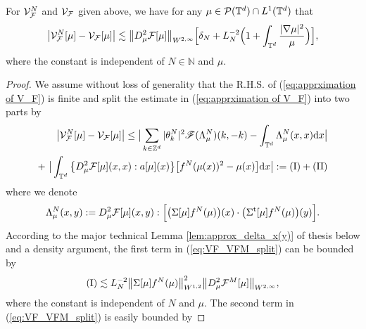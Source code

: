 \begin{lem}\label{lem:approximation_quadratic_variation} For $\mathcal{V}_{\mathcal{F}}^N$ and $\mathcal{V}_{\mathcal{F}}$ given above, we have for any $\mu \in \mathcal{P}(\mathbb{T}^d) \cap L^1(\mathbb{T}^d) $ that
\begin{equation}\label{eq:apprximation of V_F}
\begin{split}
\big|\mathcal{V}_{\mathcal{F}}^N[\mu] - \mathcal{V}_{\mathcal{F}}[\mu] \big| \lesssim\big\|D^2_{\mu} \mathcal{F}[\mu]\big\|_{W^{2,\infty}}\Big[\delta_N + L_N^{-2}\Big(1 + \int_{\mathbb{T}^d}\frac{|\nabla \mu|^2}{\mu}\Big)\Big],
\end{split}
\end{equation}
where the constant is independent of $N \in \mathbb{N}$ and $\mu$. 
\end{lem}
\begin{proof}We assume without loss of generality that the R.H.S. of (\ref{eq:apprximation of V_F}) is finite  and split the estimate in (\ref{eq:apprximation of V_F}) into two parts by 
\begin{equation}\label{eq:VF_VFM_split}
\begin{split}
\big|\mcl{V}_{\mcl{F}}^N[\mu] -  \mcl{V}_{\mcl{F}}[\mu] \big|
\leq \big|\sum_{k \in \mathbb{Z}^d} |\theta^N_k|^2 \mathscr{F}(\Lambda^{N}_{\mu})(k,-k) -  \int_{\mathbb{T}^d}\Lambda^{N}_{\mu}(x,x)\mathrm{d}x\big|\\
    + \ \big| \int_{\mathbb{T}^d} \big\{ D^2_{\mu}\mcl{F}[\mu](x,x) :  a[\mu](x)\big\} \big[f^N(\mu(x))^2 - \mu(x)\big]\mathrm{d}x\big| := (\rom{1}) + (\rom{2})
\end{split}
\end{equation} 
where we denote 
\begin{align*}
    \Lambda^{N}_{\mu}(x,y)  := D^2_{\mu}\mathcal{F}[\mu](x,y) :\Big[\big(\Sigma[\mu]f^N(\mu)\big)(x) \cdot  \big(\Sigma^{\operatorname{t}}[\mu]f^N(\mu)\big)(y)\Big].
\end{align*}
According to the major technical Lemma \ref{lem:approx_delta_x(y)} of thesis below and a density argument, the first term in (\ref{eq:VF_VFM_split}) can be bounded by 
\begin{equation}\label{eq:V_M_first_term_moll}
\begin{split}
    (\rom{1}) \lesssim L^{-2}_N\big\|\Sigma[\mu]f^N(\mu)\big\|^2_{W^{1,2}} \big\|D^2_{\mu}\mcl{F}^M[\mu]\big\|_{W^{2,\infty}},
\end{split}
\end{equation}
where the constant is independent of $N$ and $\mu$. The second term in (\ref{eq:VF_VFM_split}) is easily bounded by 

\end{proof}
